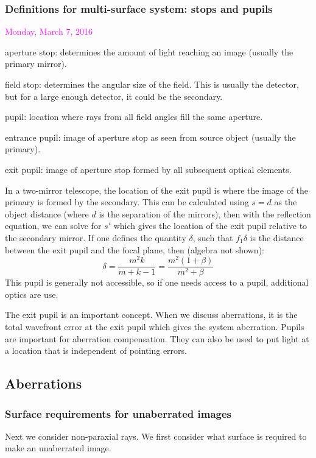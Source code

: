\documentclass[12pt]{article}
\begin{document}
\subsubsection*{Definitions for multi-surface system: stops and pupils}
\textcolor{magenta}{Monday, March 7, 2016}
\begin{itemize*}
    \item aperture stop: determines the amount of light reaching an
        image (usually the primary mirror).
    \item field stop: determines the angular size of the field. This
        is usually the detector, but for a large enough detector, it
        could be the secondary.
    \item pupil: location where rays from all field angles fill the
        same aperture.
    \item entrance pupil: image of aperture stop as seen from source
        object (usually the primary).
    \item exit pupil: image of aperture stop formed by all subsequent
        optical elements.
\end{itemize*}
In a two-mirror telescope, the location of the exit pupil is where the
image of the primary is formed by the secondary. This can be calculated
using $s=d$ as the object distance (where $d$ is the separation of the
mirrors), then with the reflection equation, we can solve for $s'$
which gives the location of the exit pupil relative to the secondary
mirror. If one defines the quantity $\delta$, such that $f_1 \delta$
is the distance between the exit pupil and the focal plane,
then (algebra not shown):
$$ \delta = \frac{m^{2}k}{m+k-1} = \frac{m^{2}(1+\beta)}{m^{2}+\beta} $$
This pupil is generally not accessible, so if one needs access to a pupil,
additional optics are use.

The exit pupil is an important concept. When we discuss aberrations, it is
the total wavefront error at the exit pupil which gives the system aberration.
Pupils are important for aberration compensation. They can also be used to
put light at a location that is independent of pointing errors.
\subsection*{Aberrations}
\subsubsection*{Surface requirements for unaberrated images}
Next we consider non-paraxial rays. We first consider what surface is
required to make an unaberrated image.
\end{document}
